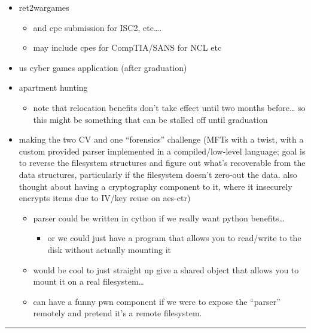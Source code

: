 \begin{itemize}
\tightlist
\item
  ret2wargames

  \begin{itemize}
  \tightlist
  \item
    and cpe submission for ISC2, etc\ldots.
  \item
    may include cpes for CompTIA/SANS for NCL etc
  \end{itemize}
\item
  us cyber games application (after graduation)
\item
  apartment hunting

  \begin{itemize}
  \tightlist
  \item
    note that relocation benefits don't take effect until two months
    before\ldots{} so this might be something that can be stalled off
    until graduation
  \end{itemize}
\item
  making the two CV and one ``forensics'' challenge (MFTs with a twist,
  with a custom provided parser implemented in a compiled/low-level
  language; goal is to reverse the filesystem structures and figure out
  what's recoverable from the data structures, particularly if the
  filesystem doesn't zero-out the data. also thought about having a
  cryptography component to it, where it insecurely encrypts items due
  to IV/key reuse on aes-ctr)

  \begin{itemize}
  \tightlist
  \item
    parser could be written in cython if we really want python
    benefits\ldots{}

    \begin{itemize}
    \tightlist
    \item
      or we could just have a program that allows you to read/write to
      the disk without actually mounting it
    \end{itemize}
  \item
    would be cool to just straight up give a shared object that allows
    you to mount it on a real filesystem\ldots{}
  \item
    can have a funny pwn component if we were to expose the ``parser''
    remotely and pretend it's a remote filesystem.
  \end{itemize}
\end{itemize}

\begin{center}\rule{0.5\linewidth}{0.5pt}\end{center}

